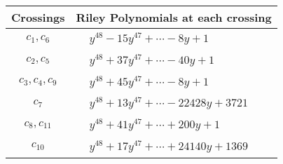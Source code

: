\documentclass[1p]{elsarticle_modified}
\theoremstyle{definition}
\begin{document}
\begin{tabular}{m{50pt}|m{274pt}}
Crossings & \hspace{64pt}Riley Polynomials at each crossing \\
\hline $$\begin{aligned}c_{1},c_{6}\end{aligned}$$&$\begin{aligned}
&y^{48}-15 y^{47}+\cdots-8 y+1
\end{aligned}$\\
\hline $$\begin{aligned}c_{2},c_{5}\end{aligned}$$&$\begin{aligned}
&y^{48}+37 y^{47}+\cdots-40 y+1
\end{aligned}$\\
\hline $$\begin{aligned}c_{3},c_{4},c_{9}\end{aligned}$$&$\begin{aligned}
&y^{48}+45 y^{47}+\cdots-8 y+1
\end{aligned}$\\
\hline $$\begin{aligned}c_{7}\end{aligned}$$&$\begin{aligned}
&y^{48}+13 y^{47}+\cdots-22428 y+3721
\end{aligned}$\\
\hline $$\begin{aligned}c_{8},c_{11}\end{aligned}$$&$\begin{aligned}
&y^{48}+41 y^{47}+\cdots+200 y+1
\end{aligned}$\\
\hline $$\begin{aligned}c_{10}\end{aligned}$$&$\begin{aligned}
&y^{48}+17 y^{47}+\cdots+24140 y+1369
\end{aligned}$\\
\hline
\end{tabular}
\vskip 2pc
\end{document}
